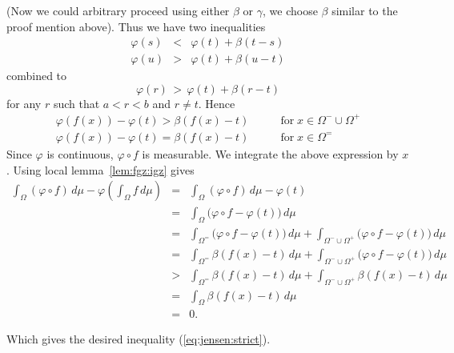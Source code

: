 \begin{thmproof}
{\small (Now we could arbitrary proceed using either \(\beta\) or \(\gamma\),
we choose \(\beta\) similar to the proof mention above).}
Thus we have two inequalities
\begin{eqnarray*}
  \varphi(s) &<& \varphi(t) + \beta(t-s)\\
  \varphi(u) &>& \varphi(t) + \beta(u-t)
\end{eqnarray*}
combined to
\begin{equation*}
  \varphi(r) \,>\, \varphi(t) + \beta(r-t)
\end{equation*}
for any $r$ such that \(a<r<b\) and \(r\neq t \).
Hence
\begin{eqnarray*}
  \varphi(f(x)) - \varphi(t) > \beta(f(x)-t)
       & \qquad \textrm{for}\; x\in\Omega^{-}\cup\Omega^{+} \\
  \varphi(f(x)) - \varphi(t) = \beta(f(x)-t)
       & \qquad \textrm{for}\; x\in\Omega^{=}
\end{eqnarray*}
Since \(\varphi\) is continuous, \(\varphi\circ f\) is measurable.
We integrate the above expression by $x$. Using local lemma~\ref{lem:fgz:igz}
gives
\begin{eqnarray*}
\int_\Omega (\varphi\circ f)\,d\mu - \varphi\left(\int_\Omega f\,d\mu\right)
&=& \int_\Omega (\varphi\circ f)\,d\mu - \varphi(t) \\
&=& \int_\Omega \bigl(\varphi\circ f - \varphi(t)\bigr) \,d\mu \\
&=& \int_{\Omega^=} \bigl(\varphi\circ f- \varphi(t)\bigr) \,d\mu
 +  \int_{\Omega^-\cup\Omega^+} \bigl(\varphi\circ f- \varphi(t)\bigr) \,d\mu \\
&=& \int_{\Omega^=} \beta(f(x) - t)\,d\mu
 +  \int_{\Omega^-\cup\Omega^+} \bigl(\varphi\circ f- \varphi(t)\bigr) \,d\mu \\
&>& \int_{\Omega^=} \beta(f(x) - t)\,d\mu
   +  \int_{\Omega^-\cup\Omega^+} \beta(f(x) - t)\,d\mu \\
&=&  \int_\Omega \beta(f(x) - t)\,d\mu \\
&=& 0.
\end{eqnarray*}

Which gives the desired inequality (\ref{eq:jensen:strict}).
\end{thmproof}




